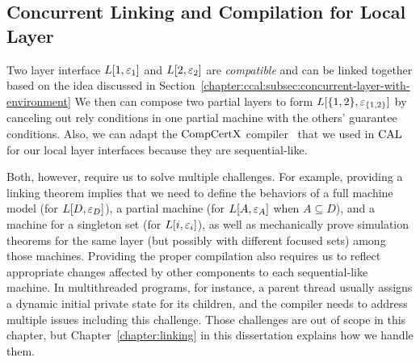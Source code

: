 \subsection{Concurrent Linking and Compilation for Local Layer}
\label{chapter:ccal:subsec:concurrent-linking-and compilation-for-local-layer}

Two layer interface $L[1, {\varepsilon}_1]$ and $L[2, {\varepsilon}_2]$ are  {\em compatible} and can be linked together based on
the idea discussed in Section~\ref{chapter:ccal:subsec:concurrent-layer-with-environment}
We then can compose two partial layers to form 
$L[\{1, 2\}, {\varepsilon}_{\{1, 2\}}]$ by canceling out rely conditions in one partial machine with the others' guarantee conditions.
Also, we can adapt the $\mathrm{CompCertX}$ compiler~\cite{deepspec} that we used in $\mathrm{CAL}$
for our local layer interfaces because they are sequential-like.

Both, however, require us to solve multiple challenges. 
For example, providing a linking theorem  
implies that we need to define the behaviors of a full machine model (for $L[D, {\varepsilon}_{D}]$), a partial machine (for $L[A, {\varepsilon}_{A}]$ when $A \subseteq D$), and 
a machine for a singleton set (for $L[i, {\varepsilon}_{i}]$), as well as mechanically prove simulation theorems for the same layer (but possibly with different focused sets) among those machines. 
Providing the proper compilation also requires 
us to reflect appropriate changes affected by other components to each sequential-like machine.
In multithreaded programs, for instance, a parent thread usually assigns a dynamic initial private state for its children,
and the compiler needs to address multiple issues including this challenge. 
Those challenges are out of scope in this chapter, but Chapter~\ref{chapter:linking} in this dissertation explains how we handle them.
